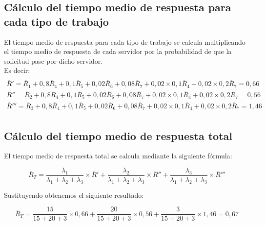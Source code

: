 \subsection{Cálculo del tiempo medio de respuesta para cada tipo de trabajo}
El tiempo medio de respuesta para cada tipo de trabajo se calcula multiplicando el tiempo medio de respuesta de cada servidor por la probabilidad de que la solicitud pase por dicho servidor.\\

Es decir:
\begin{multline}\\
\overline{R}' = \overline{R}_{1} + 0,8\overline{R}_{4} + 0,1\overline{R}_{5} + 0,02\overline{R}_{6} + 0,08\overline{R}_{7} + 0,02\times 0,1\overline{R}_{4} + 0,02\times 0,2\overline{R}_{7} = 0,66\\
\overline{R}'' = \overline{R}_{2} + 0,8\overline{R}_{4} + 0,1\overline{R}_{5} + 0,02\overline{R}_{6} + 0,08\overline{R}_{7} + 0,02\times 0,1\overline{R}_{4} + 0,02\times 0,2\overline{R}_{7} = 0,56\\
\overline{R}''' = \overline{R}_{3} + 0,8\overline{R}_{4} + 0,1\overline{R}_{5} + 0,02\overline{R}_{6} + 0,08\overline{R}_{7} + 0,02\times 0,1\overline{R}_{4} + 0,02\times 0,2\overline{R}_{7} = 1,46\\
\end{multline}

\subsection{Cálculo del tiempo medio de respuesta total}
El tiempo medio de respuesta total se calcula mediante la siguiente fórmula:

\begin{equation}
\overline{R}_{T} = \frac{\lambda_{1}}{\lambda_{1}+\lambda_{2}+\lambda_{3}}\times \overline{R}' + \frac{\lambda_{2}}{\lambda_{1}+\lambda_{2}+\lambda_{3}}\times \overline{R}'' + \frac{\lambda_{3}}{\lambda_{1}+\lambda_{2}+\lambda_{3}}\times \overline{R}'''
\end{equation}

Sustituyendo obtenemos el siguiente resultado:

\begin{equation}
\overline{R}_{T} = \frac{15}{15+20+3}\times 0,66 + \frac{20}{15+20+3}\times 0,56 + \frac{3}{15+20+3}\times 1,46 = 0,67
\end{equation}